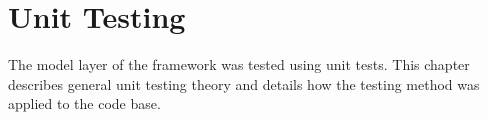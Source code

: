 \chapter{Unit Testing}
The model layer of the framework was tested using unit tests. This chapter describes general unit testing theory and details how the testing method was applied to the code base.